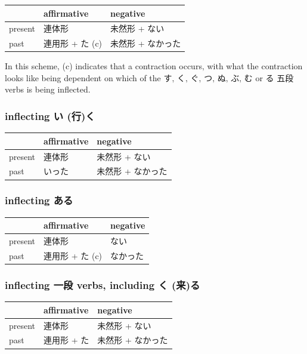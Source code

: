 \documentclass[11pt, b5paper, twoside, openright, onecolumn]{book}
\makeatletter
\newcommand*{\rubystack}[2]{{\relscale{0.5}%
  \begin{tabular}[b]{@{}c@{}}%
    {#1}\\%
   {\textscale{2}{#2}}%
  \end{tabular}}%
}
\DeclareRobustCommand*{\ruby}[2]{%
  \mbox{%
    \setlength{\parskip}{0ex}%
    \BeginAccSupp{method=pdfstringdef,ActualText={#1}}%
      \rubystack{\phantom{#2}}{#1}%
      \llap{%
        \rubystack{#2}{\phantom{#1}}%
      }%
    \EndAccSupp{}%
  }%
}
\renewcommand*{\ruby}[2]{#2 (#1)}%
\newenvironment{mytabular}[1]{\noindent\hspace{0.4in}
\begin{tabular}[h]{#1}}{\end{tabular}}
\makeatother
\begin{document}
\smaller
\begin{mytabular}{| l  l  l |}\hline 
\rule{0pt}{2.4ex} & affirmative & negative\\ 
\hline
\rule{0pt}{2.4ex}present & 連体形 & 未然形 + ない\\ 
\rule{0pt}{2.4ex}past & 連用形 + た (c) & 未然形 + なかった\\ 
\hline 
\end{mytabular}
\larger
\vspace{0.5cm}


In this scheme‚ (c) indicates that a contraction occurs‚ with what the contraction looks like being dependent on which of the す‚ く‚ ぐ‚ つ‚ ぬ‚ ぶ‚ む or る 五段 verbs is being inflected.


\subsubsection{inflecting \ruby{行}{い}く}

\smaller
\begin{mytabular}{| l  l  l |}\hline 
\rule{0pt}{2.4ex} & affirmative & negative\\ 
\hline
\rule{0pt}{2.4ex}present & 連体形 & 未然形 + ない\\ 
\rule{0pt}{2.4ex}past & いった & 未然形 + なかった\\ 
\hline 
\end{mytabular}
\larger

\subsubsection{inflecting ある}

\smaller
\begin{mytabular}{| l  l  l |}\hline 
\rule{0pt}{2.4ex} & affirmative & negative\\ 
\hline
\rule{0pt}{2.4ex}present & 連体形 & ない\\ 
\rule{0pt}{2.4ex}past & 連用形 + た (c) & なかった\\ 
\hline 
\end{mytabular}
\larger

\subsubsection{inflecting 一段 verbs‚ including \ruby{来}{く}る}

\smaller
\begin{mytabular}{| l  l  l |}\hline 
\rule{0pt}{2.4ex} & affirmative & negative\\ 
\hline
\rule{0pt}{2.4ex}present & 連体形 & 未然形 + ない\\ 
\rule{0pt}{2.4ex}past & 連用形 + た & 未然形 + なかった\\ 
\hline 
\end{mytabular}
\larger
\vspace{0.5cm}
\end{document}
